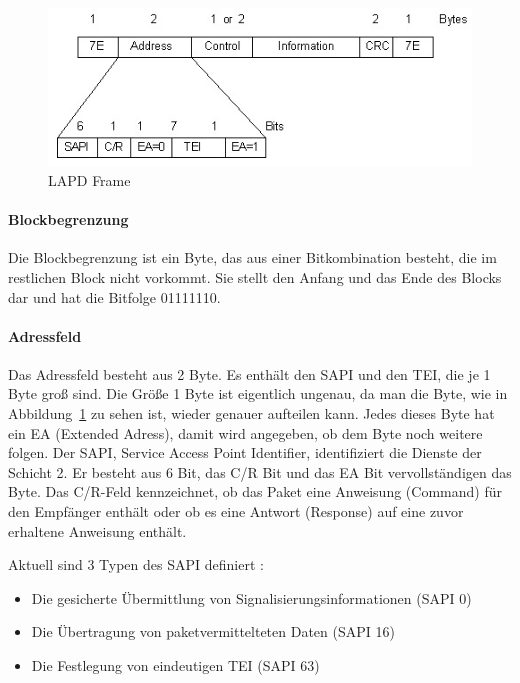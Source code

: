 \documentclass[12pt, a4paper, ngerman]{article}
\begin{document}
\begin{figure}[H]
	\centering
	\includegraphics[width=0.9\linewidth]{Grafiken/lapd_frame.jpg}
	\caption{LAPD Frame \cite{lapd_rahmen}}
	\label{lapd_frame}
\end{figure}

\paragraph{Blockbegrenzung \label{blockbegrenzung}}
Die Blockbegrenzung ist ein Byte, das aus einer Bitkombination besteht, die im restlichen Block nicht vorkommt. Sie stellt den Anfang und das Ende des Blocks dar und hat die Bitfolge 01111110.

\paragraph{Adressfeld}
Das Adressfeld besteht aus 2 Byte. Es enthält den SAPI und den TEI, die je 1 Byte groß sind. Die Größe 1 Byte ist eigentlich ungenau, da man die Byte, wie in Abbildung~\ref{lapd_frame} zu sehen ist, wieder genauer aufteilen kann. Jedes dieses Byte hat ein EA (Extended Adress), damit wird angegeben, ob dem Byte noch weitere folgen. Der SAPI, Service Access Point Identifier,  identifiziert die Dienste der Schicht 2. Er besteht aus 6 Bit,  das C/R Bit und das EA Bit vervollständigen das Byte. Das C/R-Feld kennzeichnet, ob das Paket eine Anweisung (Command) für den Empfänger enthält oder ob es eine Antwort (Response) auf eine zuvor erhaltene Anweisung enthält. 

Aktuell sind 3 Typen des SAPI definiert \cite{SWB-098672061}:
\begin{itemize}
	\item Die gesicherte Übermittlung von Signalisierungsinformationen (SAPI 0)
	\item Die Übertragung von paketvermittelteten Daten (SAPI 16)
	\item Die Festlegung von eindeutigen TEI (SAPI 63)
\end{itemize}
\end{document}

